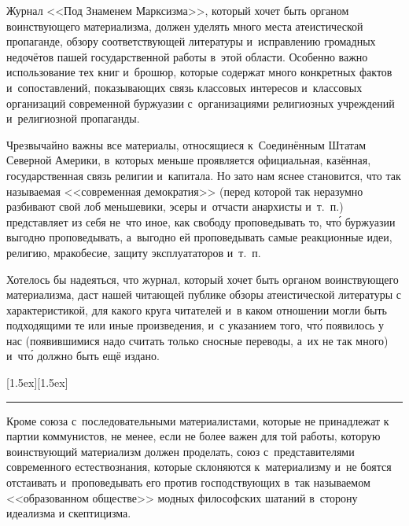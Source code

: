 Журнал <<Под Знаменем Марксизма>>, который хочет быть органом воинствующего
материализма, должен уделять много места атеистической пропаганде, обзору
соответствующей литературы и~исправлению громадных недочётов пашей
государственной работы в~этой области. Особенно важно использование тех
книг и~брошюр, которые содержат много конкретных фактов и~сопоставлений,
показывающих связь классовых интересов и~классовых организаций современной
буржуазии с~организациями религиозных учреждений и~религиозной
пропаганды.

Чрезвычайно важны все материалы, относящиеся к~Соединённым Штатам Северной
Америки, в~которых меньше проявляется официальная, казённая,
государственная связь религии и~капитала. Но зато нам яснее становится, что
так называемая <<современная демократия>> (перед которой так неразумно
разбивают свой лоб меньшевики, эсеры и~отчасти анархисты и~т.~п.)
представляет из себя не~что иное, как свободу проповедывать то, чт\'{о}
буржуазии выгодно проповедывать, а~выгодно ей проповедывать самые
реакционные идеи, религию, мракобесие, защиту эксплуататоров и~т.~п.

Хотелось бы надеяться, что журнал, который хочет быть органом воинствующего
материализма, даст нашей читающей публике обзоры атеистической литературы с
характеристикой, для какого круга читателей и~в каком отношении могли быть
подходящими те или иные произведения, и~с указанием того, чт\'{о} появилось у
нас (появившимися надо считать только сносные переводы, а~их не так много)
и~чт\'{о} должно быть ещё издано.

{\centering \raisebox{0}[1.5ex][1.5ex]{\rule{0.9cm}{0.4pt}} \par}

Кроме союза с~последовательными материалистами, которые не принадлежат к
партии коммунистов, не менее, если не более важен для той работы, которую
воинствующий материализм должен проделать, союз с~представителями
современного естествознания, которые склоняются к~материализму и~не боятся
отстаивать и~проповедывать его против господствующих в~так называемом
<<образованном обществе>> модных философских шатаний в~сторону идеализма и
скептицизма.


